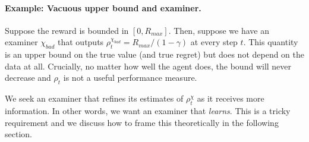 \paragraph{Example: Vacuous upper bound and examiner.} Suppose the reward is bounded in $[0, R_{max}]$. Then, suppose we have an examiner $\chi_{bad}$ that outputs $\rho^{\chi_{bad}}_t = R_{max}  / (1-\gamma)$ at every step $t$. This quantity is an upper bound on the true value (and true regret) but does not depend on the data at all. Crucially, no matter how well the agent does, the bound will never decrease and $\rho_t$ is not a useful performance measure.


We seek an examiner that refines its estimates of $\rho^\chi_t$ as it receives more information. In other words, we want an examiner that \textit{learns}. This is a tricky requirement and  we discuss how to frame this theoretically in the following section.





